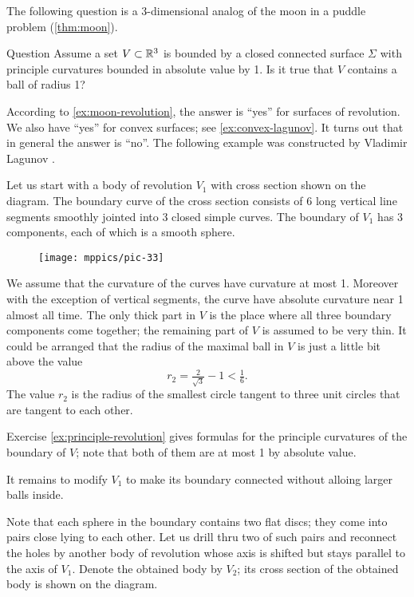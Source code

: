 The following question is a 3-dimensional analog of the moon in a puddle problem (\ref{thm:moon}).

\begin{thm}{Question}\label{quest:lagunov}
Assume a set $V\subset \mathbb{R}^3$ is bounded by a closed connected surface $\Sigma$ with 
principle curvatures bounded in absolute value by 1.
Is it true that $V$ contains a ball of radius 1?
\end{thm}

According to \ref{ex:moon-revolution}, the answer is ``yes'' for surfaces of revolution.
We also have ``yes'' for convex surfaces; see \ref{ex:convex-lagunov}.
It turns out that in general the answer is  ``no''.
The following example was constructed by Vladimir Lagunov \cite{lagunov}.


Let us start with a body of revolution $V_1$ with cross section shown on the diagram.
The boundary curve of the cross section consists of 6 long vertical line segments smoothly jointed into 3 closed simple curves. 
The boundary of $V_1$ has 3 components, each of which is a smooth sphere.

\begin{figure}[h!]%
\centering
\texttt{[image: mppics/pic-33]}
\vskip0mm
\end{figure}

We assume that the curvature of the curves have curvature at most 1.
Moreover with the exception of vertical segments, the curve have absolute curvature near 1 almost all time.
The only thick part in $V$ is the place where all three boundary components come together;
the remaining part of $V$ is assumed to be very thin.
It could be arranged that the radius of the maximal ball in $V$ is just a little bit above the value
\[r_2=\tfrac2{\sqrt{3}}-1< \tfrac16.\]
The value $r_2$ is the radius of the smallest circle tangent to three unit circles that are tangent to each other.

Exercise \ref{ex:principle-revolution} gives formulas for the principle curvatures of the boundary of $V$;
note that both of them are at most 1 by absolute value.  

It remains to modify $V_1$ to make its boundary connected without  alloing larger balls inside.

Note that each sphere in the boundary contains two flat discs;
they come into pairs close lying to each other. 
Let us drill thru two of such pairs and reconnect the holes by another body of revolution whose 
axis is shifted but stays parallel to the axis of $V_1$.
Denote the obtained body by $V_2$; its cross section of the obtained body is shown on the diagram. 

